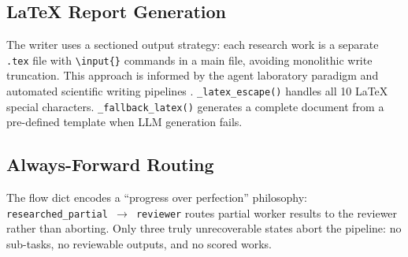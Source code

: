 \subsection{LaTeX Report Generation}

The writer uses a sectioned output strategy: each research work is a separate \texttt{.tex} file with \texttt{\textbackslash input\{\}} commands in a main file, avoiding monolithic write truncation. This approach is informed by the agent laboratory paradigm \cite{agentlaboratory} and automated scientific writing pipelines \cite{paperorchestrator}. \texttt{\_latex\_escape()} handles all 10 LaTeX special characters. \texttt{\_fallback\_latex()} generates a complete document from a pre-defined template when LLM generation fails.

\subsection{Always-Forward Routing}

The flow dict encodes a ``progress over perfection'' philosophy: \texttt{researched\_partial $\rightarrow$ reviewer} routes partial worker results to the reviewer rather than aborting. Only three truly unrecoverable states abort the pipeline: no sub-tasks, no reviewable outputs, and no scored works.
